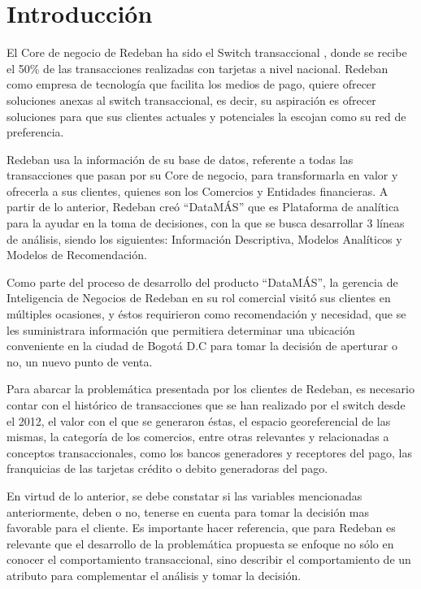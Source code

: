 \documentclass[a4paper]{article}
\begin{document}
\newpage

\tableofcontents

\listoffigures



\newpage

\section{Introducción}

El Core de negocio de Redeban ha sido el Switch transaccional , donde se recibe el 50\% de las transacciones realizadas con tarjetas a nivel nacional. Redeban como empresa de tecnología que facilita los medios de pago, quiere ofrecer soluciones anexas al switch transaccional, es decir, su aspiración es ofrecer soluciones para que sus clientes actuales y potenciales la escojan como su red de preferencia.

Redeban usa la información de su base de datos, referente a todas las transacciones que pasan por su Core de negocio, para transformarla en valor y ofrecerla a sus clientes, quienes son los Comercios y Entidades financieras. A partir de lo anterior, Redeban creó “DataMÁS” que es Plataforma de analítica para la ayudar en la toma de decisiones, con la que se busca desarrollar 3 líneas de análisis, siendo los siguientes: Información Descriptiva, Modelos Analíticos y Modelos de Recomendación.

Como parte del proceso de desarrollo del producto “DataMÁS”, la gerencia de Inteligencia de Negocios de Redeban en su rol comercial visitó sus clientes en múltiples ocasiones, y éstos requirieron como recomendación y necesidad, que se les suministrara información que permitiera determinar una ubicación conveniente en la ciudad de Bogotá D.C para tomar la decisión de aperturar o no, un nuevo punto de venta.

Para abarcar la problemática presentada por los clientes de Redeban, es necesario contar con el histórico de transacciones que se han realizado por el switch desde el 2012, el valor con el que se generaron éstas, el espacio georeferencial de las mismas, la categoría de los comercios, entre otras relevantes y relacionadas a conceptos transaccionales, como los bancos generadores y receptores del pago, las franquicias de las tarjetas crédito o debito generadoras del pago.

En virtud de lo anterior, se debe constatar si las variables mencionadas anteriormente, deben o no, tenerse en cuenta para tomar la decisión mas favorable para el cliente. Es importante hacer referencia, que para Redeban es relevante que el desarrollo de la problemática propuesta se enfoque no sólo en conocer el comportamiento transaccional, sino describir el comportamiento de un atributo para complementar el análisis y tomar la decisión.
\end{document}
